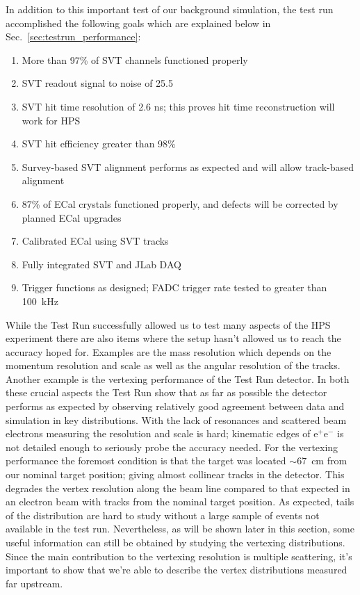 In addition to this important test of our background simulation, the test run accomplished the following goals which are explained below in Sec.~\ref{sec:testrun_performance}:
\begin{enumerate}
	\item More than 97\% of SVT channels functioned properly
	\item SVT readout signal to noise of 25.5
	\item SVT hit time resolution of 2.6 ns; this proves hit time reconstruction will work for HPS
	\item SVT hit efficiency greater than 98\%
	\item Survey-based SVT alignment performs as expected and will allow track-based alignment
	\item 87\% of ECal crystals functioned properly, and defects will be corrected by planned ECal upgrades
	\item Calibrated ECal using SVT tracks
	\item Fully integrated SVT and JLab DAQ
	\item Trigger functions as designed; FADC trigger rate tested to greater than 100~kHz
\end{enumerate}

While the Test Run successfully allowed us to test many aspects of the HPS experiment there 
are also items where the setup hasn't allowed us to reach the accuracy hoped for. Examples are the mass 
resolution which depends on the momentum resolution and scale as well as the angular resolution of 
the tracks. Another example is the vertexing performance of the Test Run detector. In both these crucial 
aspects the Test Run show that as far as possible the detector performs as expected by observing relatively good agreement between data and simulation in key distributions. With the lack of resonances 
and scattered beam electrons measuring the resolution and scale is hard;  kinematic edges of 
e$^+$e$^-$ is not detailed enough to seriously probe the accuracy needed. For the vertexing 
performance the foremost condition is that the target was located $\sim67$~cm from our nominal target 
position; giving almost collinear tracks in the detector. This degrades the vertex resolution along the 
beam line compared to that expected in an electron beam with tracks from the nominal target position. 
As expected, tails of the distribution are hard to study without a large sample of events not available 
in the test run.  Nevertheless, as will be shown later in this section, some useful information can still be 
obtained by studying the vertexing distributions. Since the main contribution to the vertexing resolution is 
multiple scattering, it's important to show that we're able to describe the vertex distributions measured 
far upstream.  


